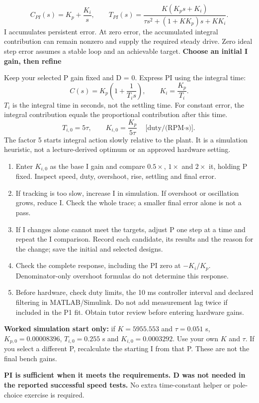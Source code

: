 \documentclass[11pt,a4paper]{article}
\newcommand{\sect}[1]{\vspace{4pt}{\large\bfseries\color{teal}#1}\par\vspace{3pt}}
\newcommand{\sub}[1]{\vspace{4pt}\textbf{#1}\par}
\newcommand{\note}[1]{\par\begingroup\setlength{\fboxsep}{7pt}\noindent\colorbox{pale}{\parbox{\dimexpr\linewidth-14pt\relax}{#1}}\endgroup\par}
\begin{document}
\newpage
\sect{3. Add I and tune PI in simulation}
\[
C_{PI}(s)=K_p+\frac{K_i}{s},\qquad
T_{PI}(s)=\frac{K(K_ps+K_i)}{\tau s^2+(1+KK_p)s+KK_i}.
\]
I accumulates persistent error. At zero error, the accumulated integral contribution can remain nonzero and supply the required steady drive. Zero ideal step error assumes a stable loop and an achievable target.
\sub{Choose an initial I gain, then refine}
Keep your selected P gain fixed and D = 0. Express PI using the integral time:
\[
C(s)=K_p\left(1+\frac{1}{T_is}\right),\qquad K_i=\frac{K_p}{T_i}.
\]
$T_i$ is the integral time in seconds, not the settling time. For constant error, the integral contribution equals the proportional contribution after this time.
\[
T_{i,0}=5\tau,\qquad K_{i,0}=\frac{K_p}{5\tau}\quad\text{[duty/(RPM$\cdot$s)].}
\]
The factor 5 starts integral action slowly relative to the plant. It is a simulation heuristic, not a lecture-derived optimum or an approved hardware setting.
\begin{enumerate}
\item Enter $K_{i,0}$ as the base I gain and compare $0.5\times$, $1\times$ and $2\times$ it, holding P fixed. Inspect speed, duty, overshoot, rise, settling and final error.
\item If tracking is too slow, increase I in simulation. If overshoot or oscillation grows, reduce I. Check the whole trace; a smaller final error alone is not a pass.
\item If I changes alone cannot meet the targets, adjust P one step at a time and repeat the I comparison. Record each candidate, its results and the reason for the change; save the initial and selected designs.
\item Check the complete response, including the PI zero at $-K_i/K_p$. Denominator-only overshoot formulas do not determine this response.
\item Before hardware, check duty limits, the 10 ms controller interval and declared filtering in MATLAB/Simulink. Do not add measurement lag twice if included in the P1 fit. Obtain tutor review before entering hardware gains.
\end{enumerate}
\textbf{Worked simulation start only:} if $K=5955.553$ and $\tau=0.051$ s, $K_{p,0}=0.00008396$, $T_{i,0}=0.255$ s and $K_{i,0}=0.0003292$. Use your own $K$ and $\tau$. If you select a different P, recalculate the starting I from that P. These are not the final bench gains.
\note{\textbf{PI is sufficient when it meets the requirements. D was not needed in the reported successful speed tests.} No extra time-constant helper or pole-choice exercise is required.}
\end{document}
